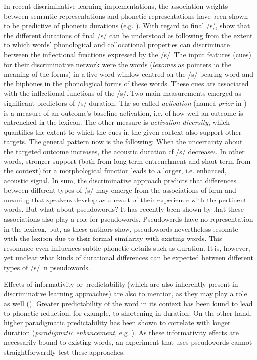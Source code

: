 In recent discriminative learning implementations, the association weights between semantic representations and phonetic representations have been shown to be predictive of phonetic durations (e.g. \cite{Stein2021}). With regard to final /s/, \citet{Tomaschek2019} show that the different durations of final /s/ can be understood as following from the extent to which words’ phonological and collocational properties can discriminate between the inflectional functions expressed by the /s/. The input features (cues) for their discriminative network were the words (\textit{lexomes} as pointers to the meaning of the forms) in a five-word window centred on the /s/-bearing word and the biphones in the phonological forms of these words. These cues are associated with the inflectional functions of the /s/. Two main measurements emerged as significant predictors of /s/ duration. The so-called \textit{activation} (named \textit{prior} in \cite{Tomaschek2019}) is a measure of an outcome’s baseline activation, i.e. of how well an outcome is entrenched in the lexicon. The other measure is \textit{activation diversity}, which quantifies the extent to which the cues in the given context also support other targets. The general pattern now is the following: When the uncertainty about the targeted outcome increases, the acoustic duration of /s/ decreases. In other words, stronger support (both from long-term entrenchment and short-term from the context) for a morphological function leads to a longer, i.e. enhanced, acoustic signal. 
In sum, the discriminative approach predicts that differences between different types of /s/ may emerge from the associations of form and meaning that speakers develop as a result of their experience with the pertinent words. But what about pseudowords?  It has recently been shown by \citet{Chuang2021} that these associations also play a role for pseudowords. Pseudowords have no representation in the lexicon, but, as these authors show, pseudowords nevertheless resonate with the lexicon due to their formal similarity with existing words. This resonance even influences subtle phonetic details such as duration. It is, however, yet unclear what kinds of durational differences can be expected between different types of /s/ in pseudowords.

Effects of informativity or predictability (which are also inherently present in discriminative learning approaches) are also to mention, as they may play a role as well (\cite{Seyfarth2014, Priva2015, Zee2021}). Greater predictability of the word in its context has been found to lead to phonetic reduction, for example, to shortening in duration. On the other hand, higher paradigmatic predictability has been shown to correlate with longer duration (\textit{paradigmatic enhancement}, e.g. \cite{Kuperman2007, Bell2021}). As these informativity effects are necessarily bound to existing words, an experiment that uses pseudowords cannot straightforwardly test these approaches. 

